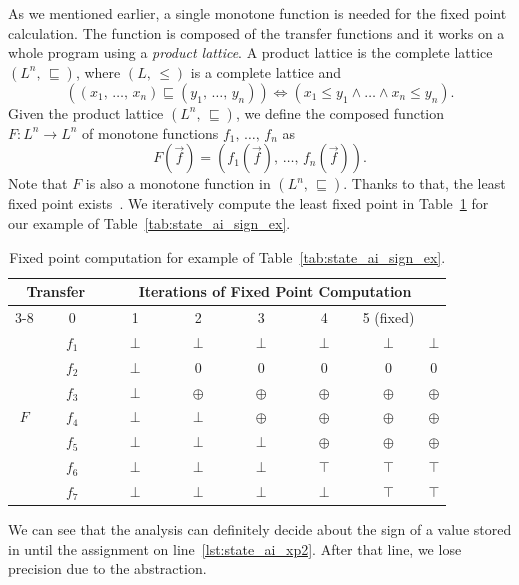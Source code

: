 As we mentioned earlier, a single monotone function is needed for the fixed
point calculation. The function is composed of the transfer functions and it
works on a whole program using a \emph{product lattice}. A product lattice is
the complete lattice $(L^n,\, \sqsubseteq)$, where $(L,\, \leq)$ is a complete
lattice and
\begin{equation*}
\left(\left(x_1,\, \dots,\, x_n\right) \sqsubseteq \left(y_1,\, \dots,\,
  y_n\right)\right) \Leftrightarrow
  \left(x_1 \leq y_1 \wedge \dots \wedge x_n \leq y_n\right).
\end{equation*}
Given the product lattice $(L^n,\, \sqsubseteq)$, we define the composed
function $F: L^n \rightarrow L^n$ of monotone functions $f_1,\, \dots,\, f_n$
as
\begin{equation*}
F\left(\overrightarrow{f}\right) =
  \left(f_1\left(\overrightarrow{f}\right),\, \dots,\,
  f_n\left(\overrightarrow{f}\right)\right).
\end{equation*}
Note that $F$ is also a monotone function in $(L^n,\, \sqsubseteq)$. Thanks to
that, the least fixed point exists~\cite{kleene, tarski}.  We iteratively
compute the least fixed point in Table~\ref{tab:state_ai_sign_fp} for our
example of Table~\ref{tab:state_ai_sign_ex}.
\begin{table}[tb]
  \begin{center}
\begin{tabular}{|c|c||c|c|c|c|c|c|} \hline
\multicolumn{2}{|c||}{\textbf{Transfer}} &
  \multicolumn{6}{c|}{\textbf{Iterations of Fixed Point Computation}}
  \\ \cline{3-8}
\multicolumn{2}{|c||}{\textbf{Function}} &
  ~~~0~~~ & ~~~1~~~ & ~~~2~~~ & ~~~3~~~ & ~~~4~~~ & 5 (fixed) \\ \hline\hline
\multirow{7}{*}{$F$} &
  $f_1$ & $\bot$ & $\bot$   & $\bot$   & $\bot$   & $\bot$   & $\bot$ \\
  \cline{2-8}
& $f_2$ & $\bot$ & $0$      & $0$      & $0$      & $0$      & $0$ \\
  \cline{2-8}
& $f_3$ & $\bot$ & $\oplus$ & $\oplus$ & $\oplus$ & $\oplus$ & $\oplus$ \\
  \cline{2-8}
& $f_4$ & $\bot$ & $\bot$   & $\oplus$ & $\oplus$ & $\oplus$ & $\oplus$ \\
  \cline{2-8}
& $f_5$ & $\bot$ & $\bot$   & $\bot$   & $\oplus$ & $\oplus$ & $\oplus$ \\
  \cline{2-8}
& $f_6$ & $\bot$ & $\bot$   & $\bot$   & $\top$   & $\top$   & $\top$ \\
  \cline{2-8}
& $f_7$ & $\bot$ & $\bot$   & $\bot$   & $\bot$   & $\top$   & $\top$ \\
  \hline
\end{tabular}
  \end{center}
  \caption{Fixed point computation for example of
  Table~\ref{tab:state_ai_sign_ex}.}
  \label{tab:state_ai_sign_fp}
\end{table}
We can see that the analysis can definitely decide about the sign of a value
stored in  until the assignment on line~\ref{lst:state_ai_xp2}. After
that line, we lose precision due to the abstraction.

